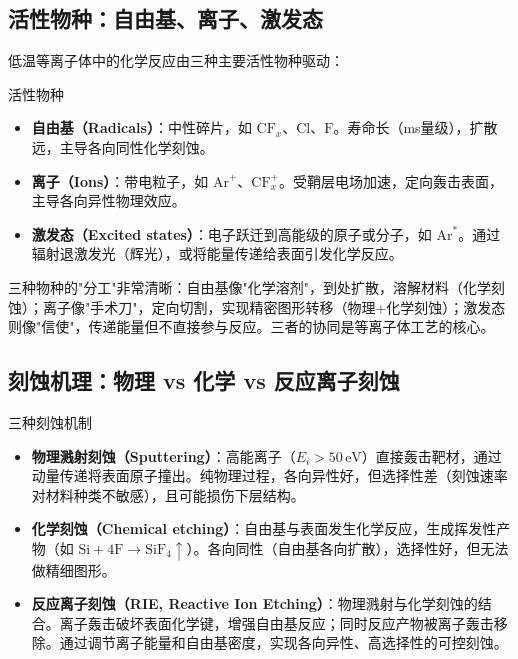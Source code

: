 \subsection{活性物种：自由基、离子、激发态}

低温等离子体中的化学反应由三种主要活性物种驱动：

\begin{definition}{活性物种}{}{}
\label{def:active-species}
\begin{itemize}
\item \textbf{自由基（Radicals）}：中性碎片，如 $\mathrm{CF}_x$、$\mathrm{Cl}$、$\mathrm{F}$。寿命长（ms量级），扩散远，主导各向同性化学刻蚀。
\item \textbf{离子（Ions）}：带电粒子，如 $\mathrm{Ar}^+$、$\mathrm{CF}_x^+$。受鞘层电场加速，定向轰击表面，主导各向异性物理效应。
\item \textbf{激发态（Excited states）}：电子跃迁到高能级的原子或分子，如 $\mathrm{Ar}^*$。通过辐射退激发光（辉光），或将能量传递给表面引发化学反应。
\end{itemize}
\end{definition}

\begin{insight}{}{}
三种物种的"分工"非常清晰：自由基像"化学溶剂"，到处扩散，溶解材料（化学刻蚀）；离子像"手术刀"，定向切割，实现精密图形转移（物理+化学刻蚀）；激发态则像"信使"，传递能量但不直接参与反应。三者的协同是等离子体工艺的核心。
\end{insight}

\subsection{刻蚀机理：物理 vs 化学 vs 反应离子刻蚀}

\begin{definition}{三种刻蚀机制}{}{}
\label{def:etching-mechanisms}
\begin{itemize}
\item \textbf{物理溅射刻蚀（Sputtering）}：高能离子（$E_i > 50\,\mathrm{eV}$）直接轰击靶材，通过动量传递将表面原子撞出。纯物理过程，各向异性好，但选择性差（刻蚀速率对材料种类不敏感），且可能损伤下层结构。
\item \textbf{化学刻蚀（Chemical etching）}：自由基与表面发生化学反应，生成挥发性产物（如 $\mathrm{Si} + 4\mathrm{F} \to \mathrm{SiF}_4\uparrow$）。各向同性（自由基各向扩散），选择性好，但无法做精细图形。
\item \textbf{反应离子刻蚀（RIE, Reactive Ion Etching）}：物理溅射与化学刻蚀的结合。离子轰击破坏表面化学键，增强自由基反应；同时反应产物被离子轰击移除。通过调节离子能量和自由基密度，实现各向异性、高选择性的可控刻蚀。
\end{itemize}
\end{definition}

